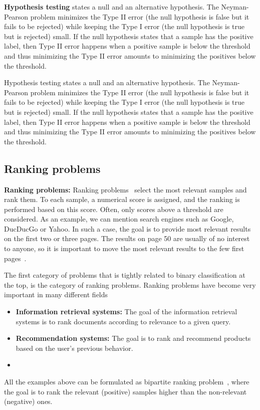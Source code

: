 \textbf{Hypothesis testing} states a null and an alternative hypothesis. The Neyman-Pearson problem minimizes the Type II error (the null hypothesis is false but it fails to be rejected) while keeping the Type I error (the null hypothesis is true but is rejected) small. If the null hypothesis states that a sample has the positive label, then Type II error happens when a positive sample is below the threshold and thus minimizing the Type II error amounts to minimizing the positives below the threshold.

Hypothesis testing states a null and an alternative hypothesis. The Neyman-Pearson problem minimizes the Type II error (the null hypothesis is false but it fails to be rejected) while keeping the Type I error (the null hypothesis is true but is rejected) small. If the null hypothesis states that a sample has the positive label, then Type II error happens when a positive sample is below the threshold and thus minimizing the Type II error amounts to minimizing the positives below the threshold.


\subsection{Ranking problems}

\textbf{Ranking problems:} Ranking problems~\cite{freund2003efficient, agarwal2011infinite, rudin2009pnorm, li2014top} select the most relevant samples and rank them. To each sample, a numerical score is assigned, and the ranking is performed based on this score. Often, only scores above a threshold are considered. As an example, we can mention search engines such as Google, DucDucGo or Yahoo. In such a case, the goal is to provide most relevant results on the first two or three pages. The results on page 50 are usually of no interest to anyone, so it is important to move the most relevant results to the few first pages~\cite{cortes2003auc}.



The first category of problems that is tightly related to binary classification at the top, is the category of ranking problems. Ranking problems have become very important in many different fields
\begin{itemize}
  \item \textbf{Information retrieval systems:} The goal of the information retrieval systems is to rank documents according to relevance to a given query.
  \item \textbf{Recommendation  systems:} The goal is to rank and recommend products based on the user's previous behavior.
  \item 
\end{itemize}
All the examples above can be formulated as bipartite ranking problem~\cite{freund2003efficient, agarwal2005generalization, agarwal2011infinite}, where the goal is to rank the relevant (positive) samples higher than the non-relevant (negative) ones. 



